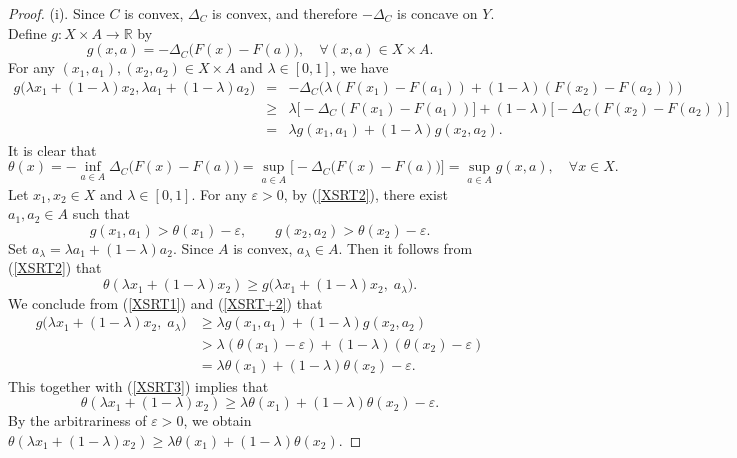 \documentclass[11pt]{article}
\begin{document}
\begin{proof}
	(i). Since $C$ is convex, $\Delta_C$ is convex, and therefore $-\Delta_C$ is concave on $Y$. Define $g: X\times A \to \mathbb{R}$ by
	\[
	g(x,a) = -\Delta_C\big(F(x)-F(a)\big),  \quad  \forall  (x,a)  \in  X\times A.
	\]
	For any $(x_1,a_1),(x_2,a_2) \in X\times A$ and $\lambda\in[0,1]$, we have
	\begin{eqnarray} \label{XSRT1}
		g\bigl( \lambda x_1 + (1-\lambda)x_2, \lambda a_1 + (1-\lambda)a_2 \bigr)
		&=& -\Delta_C\big( \lambda(F(x_1)-F(a_1)) + (1-\lambda)(F(x_2)-F(a_2)) \big) \nonumber\\ 
		&\ge& \lambda\big[-\Delta_C(F(x_1)-F(a_1))\big] + (1-\lambda)\big[-\Delta_C(F(x_2)-F(a_2))\big] \nonumber\\ 
		&=& \lambda g(x_1,a_1) + (1-\lambda)g(x_2,a_2).  
\end{eqnarray}
It is clear that
	\begin{equation} \label{XSRT2}
		\theta(x) = -\inf_{a\in A} \Delta_C\big(F(x)-F(a)\big)
		= \sup_{a\in A} \Big[-\Delta_C\big(F(x)-F(a)\big)\Big]
		= \sup_{a\in A} g(x,a), \quad \forall x \in X.  
	\end{equation}
Let $x_1, x_2 \in X$ and $\lambda\in[0,1]$.
	For any $\varepsilon>0$, by (\ref{XSRT2}), there exist $a_1,a_2\in A$ such that
\begin{equation} \label{XSRT+2}
	g(x_1,a_1) > \theta(x_1) - \varepsilon, \qquad g(x_2,a_2) > \theta(x_2) - \varepsilon.
\end{equation}
	Set $a_\lambda = \lambda a_1 + (1-\lambda)a_2$. Since $A$ is convex, $a_\lambda \in A$. Then  it follows from  (\ref{XSRT2})  that
\begin{equation} \label{XSRT3}
	\theta(\lambda x_1 + (1-\lambda)x_2) \ge g\big(\lambda x_1 + (1-\lambda)x_2,\; a_\lambda\big).
	\end{equation}
    We conclude from  (\ref{XSRT1})  and  (\ref{XSRT+2})  that
	\[
	\begin{aligned}
		g\big(\lambda x_1 + (1-\lambda)x_2,\; a_\lambda\big)
		&\ge \lambda g(x_1,a_1) + (1-\lambda)g(x_2,a_2) \\
		&> \lambda(\theta(x_1)-\varepsilon) + (1-\lambda)(\theta(x_2)-\varepsilon) \\
		&= \lambda\theta(x_1) + (1-\lambda)\theta(x_2) - \varepsilon.
	\end{aligned}
	\]
	  This together with   (\ref{XSRT3})  implies that 
	\[
	\theta(\lambda x_1 + (1-\lambda)x_2) \ge \lambda\theta(x_1) + (1-\lambda)\theta(x_2) - \varepsilon.
	\]
	By the arbitrariness of $\varepsilon>0$, we obtain
$
	\theta(\lambda x_1 + (1-\lambda)x_2) \ge \lambda\theta(x_1) + (1-\lambda)\theta(x_2).
$
	

\end{proof}
\end{document}
